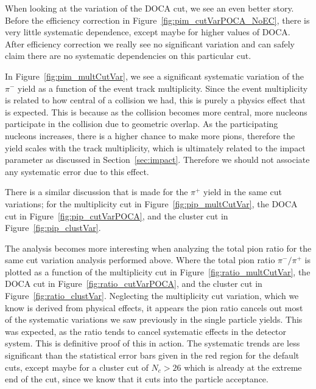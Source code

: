 When looking at the variation of the DOCA cut, we see an even better story. Before the efficiency correction in Figure~\ref{fig:pim_cutVarPOCA_NoEC}, there is very little systematic dependence, except maybe for higher values of DOCA. After efficiency correction we really see no significant variation and can safely claim there are no systematic dependencies on this particular cut. 

In Figure~\ref{fig:pim_multCutVar}, we see  a significant systematic variation of the $\pi^-$ yield as a function of the event track multiplicity. Since the event multiplicity is related to how central of a collision we had, this is purely a physics effect that is expected. This is because as the collision becomes more central, more nucleons participate in the collision due to geometric overlap. As the participating nucleons increases, there is a higher chance to make more pions, therefore the yield scales with the track multiplicity, which is ultimately related to the impact parameter as discussed in Section~\ref{sec:impact}. Therefore we should not associate any systematic error due to this effect.

There is a similar discussion that is made for the $\pi^+$ yield in the same cut variations; for the multiplicity cut in Figure~\ref{fig:pip_multCutVar}, the DOCA cut in Figure~\ref{fig:pip_cutVarPOCA}, and the cluster cut in Figure~\ref{fig:pip_clustVar}.


The analysis becomes more interesting when analyzing the total pion ratio for the same cut variation analysis performed above. Where the total pion ratio $\pi^-/\pi^+$ is plotted as a function of the multiplicity cut in Figure~\ref{fig:ratio_multCutVar}, the DOCA cut in Figure~\ref{fig:ratio_cutVarPOCA}, and the cluster cut in Figure~\ref{fig:ratio_clustVar}. Neglecting the multiplicity cut variation, which we know is derived from physical effects, it appears the pion ratio cancels out most of the systematic variations we saw previously in the single particle yields. This was expected, as the ratio tends to cancel systematic effects in the detector system. This is definitive proof of this in action. The systematic trends are less significant than the statistical error bars given in the red region for the default cuts, except maybe for a cluster cut of $N_c > 26$ which is already at the extreme end of the cut, since we know that it cuts into the particle acceptance.  



 


